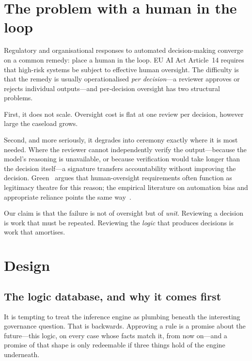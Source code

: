 \documentclass[sigconf,nonacm]{acmart}
\begin{document}

\maketitle

\section{The problem with a human in the loop}

Regulatory and organisational responses to automated decision-making converge on
a common remedy: place a human in the loop. EU AI Act Article~14 requires that
high-risk systems be subject to effective human oversight. The difficulty is
that the remedy is usually operationalised \emph{per decision}---a reviewer
approves or rejects individual outputs---and per-decision oversight has two
structural problems.

First, it does not scale. Oversight cost is flat at one review per decision,
however large the caseload grows.

Second, and more seriously, it degrades into ceremony exactly where it is most
needed. Where the reviewer cannot independently verify the output---because the
model's reasoning is unavailable, or because verification would take longer than
the decision itself---a signature transfers accountability without improving the
decision. Green~\cite{green2022} argues that human-oversight requirements often
function as legitimacy theatre for this reason; the empirical literature on
automation bias and appropriate reliance points the same
way~\cite{parasuraman1997,bucinca2021,bansal2021}.

Our claim is that the failure is not of oversight but of \emph{unit}. Reviewing
a decision is work that must be repeated. Reviewing the \emph{logic} that
produces decisions is work that amortises.

\section{Design}

\subsection{The logic database, and why it comes first}
\label{sec:engine}

It is tempting to treat the inference engine as plumbing beneath the interesting
governance question. That is backwards. Approving a rule is a promise about the
future---this logic, on every case whose facts match it, from now on---and a
promise of that shape is only redeemable if three things hold of the engine
underneath.
\end{document}
